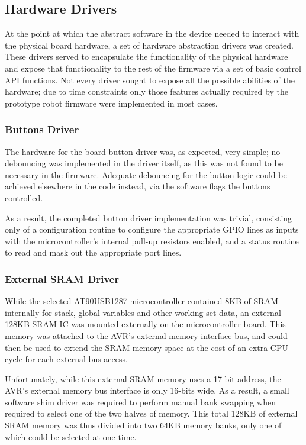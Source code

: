 \FloatBarrier
\subsection{Hardware Drivers}

At the point at which the abstract software in the device needed to interact with the physical board hardware, a set of hardware abstraction drivers was created. These drivers served to encapsulate the functionality of the physical hardware and expose that functionality to the rest of the firmware via a set of basic control API functions. Not every driver sought to expose all the possible abilities of the hardware; due to time constraints only those features actually required by the prototype robot firmware were implemented in most cases.

\FloatBarrier
\subsubsection{Buttons Driver}

The hardware for the board button driver was, as expected, very simple; no debouncing was implemented in the driver itself, as this was not found to be necessary in the firmware. Adequate debouncing for the button logic could be achieved elsewhere in the code instead, via the software flags the buttons controlled.

As a result, the completed button driver implementation was trivial, consisting only of a configuration routine to configure the appropriate GPIO lines as inputs with the microcontroller's internal pull-up resistors enabled, and a status routine to read and mask out the appropriate port lines.

\FloatBarrier
\subsubsection{External SRAM Driver}

While the selected AT90USB1287 microcontroller contained 8KB of SRAM internally for stack, global variables and other working-set data, an external 128KB SRAM IC was mounted externally on the microcontroller board. This memory was attached to the AVR's external memory interface bus, and could then be used to extend the SRAM memory space at the cost of an extra CPU cycle for each external bus access.

Unfortunately, while this external SRAM memory uses a 17-bit address, the AVR's external memory bus interface is only 16-bits wide. As a result, a small software shim driver was required to perform manual bank swapping when required to select one of the two halves of memory. This total 128KB of external SRAM memory was thus divided into two 64KB memory banks, only one of which could be selected at one time.

